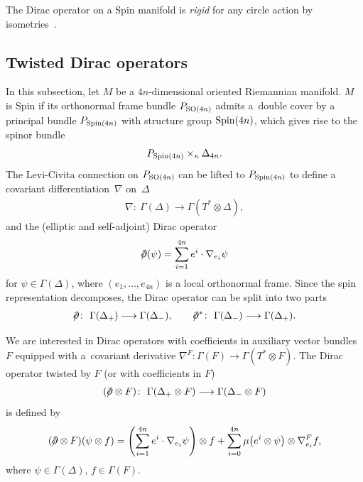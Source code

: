 \documentclass[10pt,a4paper]{amsart}
\newcommand{\dirac}{/\kern-5pt\partial}
\numberwithin{equation}{section}
\begin{document}
\begin{Example} The Dirac operator on a Spin manifold is {\em rigid} for any circle action by iso\-met\-ries~\cite{AH}.
\end{Example}

\subsection{Twisted Dirac operators}

In this subsection, let $M$ be a $4n$-dimensional oriented Riemannian manifold. $M$ is Spin if its orthonormal frame bundle $P_{{\rm SO}(4n)}$ admits a~double cover by a principal bundle $P_{{\rm Spin}(4n)}$ with structure group ${\rm Spin}(4n)$, which gives rise to the spinor bundle
\begin{gather*}P_{{\rm Spin}(4n)}\times_{\kappa}\Delta_{4n}. \end{gather*}
The Levi-Civita connection on $P_{{\rm SO}(4n)}$ can be lifted to $P_{{\rm Spin}(4n)}$ to def\/ine a covariant dif\/ferentia\-tion~$\nabla$ on~$\Delta$
\begin{gather*}\nabla\colon \ \Gamma (\Delta ) \longrightarrow \Gamma (T^*\otimes \Delta),\end{gather*}
and the (elliptic and self-adjoint) Dirac operator
\begin{gather*}\dirac (\psi) = \sum_{i=1}^{4n} e^i\cdot \nabla_{e_i}\psi\end{gather*}
for $\psi\in\Gamma(\Delta)$, where $(e_1,\dots, e_{4n})$ is a local orthonormal frame. Since the spin representation decomposes, the Dirac operator can be split into two parts
\begin{gather*}\dirac\colon \ \Gamma (\Delta_+ ) \longrightarrow \Gamma ( \Delta_-),\qquad
\dirac^*\colon \ \Gamma (\Delta_- ) \longrightarrow \Gamma ( \Delta_+).\end{gather*}

We are interested in Dirac operators with coef\/f\/icients in auxiliary vector bundles $F$ equipped with a~covariant derivative $\nabla^F\colon \Gamma(F)\longrightarrow\Gamma(T^*\otimes F)$. The Dirac operator twisted by $F$ (or with coef\/f\/icients
in $F$)
\begin{gather*}(\dirac\otimes F)\colon \ \Gamma (\Delta_+\otimes F) \longrightarrow \Gamma (\Delta_-\otimes F)\end{gather*}
is def\/ined by
\begin{gather*}(\dirac\otimes F) (\psi\otimes f) = \left(\sum_{i=1}^{4n} e^i\cdot \nabla_{e_i}\psi\right)\otimes f + \sum_{i=0}^{4n}
\mu\big(e^i\otimes \psi\big) \otimes \nabla_{e_i}^F f,\end{gather*}
where $\psi\in\Gamma(\Delta)$, $f\in\Gamma(F)$.
\end{document}
